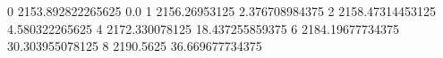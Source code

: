 0 2153.892822265625 0.0
1 2156.26953125 2.376708984375
2 2158.47314453125 4.580322265625
4 2172.330078125 18.437255859375
6 2184.19677734375 30.303955078125
8 2190.5625 36.669677734375

